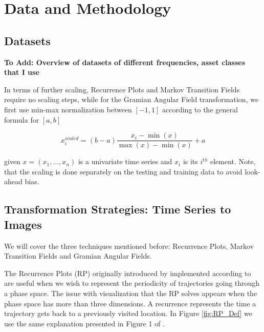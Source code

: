 \documentclass[11pt, a4paper]{article}
\begin{document}
\section{Data and Methodology}
\label{sec:DM}
\subsection{Datasets}
\label{subsec:DM:Data}

\textbf{To Add: Overview of datasets of different frequencies, asset classes that I use}

In terms of further scaling, Recurrence Plots and Markov Transition Fields require no scaling steps, while for the Gramian Angular Field transformation, we first use min-max normalization between $[-1, 1]$ according to the general formula for $[a, b]$

\begin{equation}
\label{eq:minmax}
    x^{scaled}_i =(b-a)\frac{x_i-\min(x)}{\max(x) - \min(x)} + a
\end{equation}

given $x = (x_1, \dots, x_n)$ is a univariate time series and $x_i$ is its $i^{th}$ element. Note, that the scaling is done separately on the testing and training data to avoid look-ahead bias.

\subsection{Transformation Strategies: Time Series to Images}
\label{subsec:DM:TS2IM}

We will cover the three techniques mentioned before: Recurrence Plots, Markov Transition Fields and Gramian Angular Fields.

The Recurrence Plots (RP) originally introduced by \cite{jp1987recurrence} implemented according to \cite{hatami2018classification} are useful when we wish to represent the periodicity of trajectories going through a phase space. The issue with visualization that the RP solves appears when the phase space has more than three dimensions. A recurrence represents the time a trajectory gets back to a previously visited location. In Figure \ref{fig:RP_Def} we use the same explanation presented in Figure 1 of \cite{hatami2018classification}.
\end{document}
